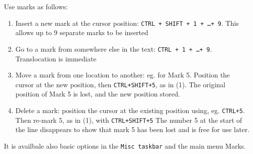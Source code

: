 Use marks as follows:
\begin{enumerate}
  \item Insert a new mark at the cursor position: \texttt{CTRL + SHIFT + 1 + \ldots + 9}.
    This allows up to 9 separate marks to be inserted
  \item Go to a mark from somewhere else in the text: \texttt{CTRL + 1 + \ldots + 9}.
    Translocation is immediate
  \item Move a mark from one location to another: eg. for Mark 5.
    Position the cursor at the new position, then \texttt{CTRL+SHIFT+5}, as in (1).
    The original position of Mark 5 is lost, and the new position stored.
  \item Delete a mark: position the cursor at the existing position using, eg. \texttt{CTRL+5}.
    Then re-mark 5, as in (1), with \texttt{CTRL+SHIFT+5}
    The number 5 at the start of the line disappears to show that mark 5 has been lost and is free for use later.
\end{enumerate}

It is availbale also basic options in the \texttt{Misc taskbar} and the main menu Marks.